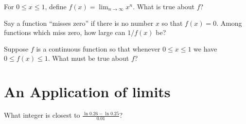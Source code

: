 \documentclass{ximera}
\begin{document}
\begin{problem}

  For $0 \leq x \leq 1$, define
  $f(x) = \lim_{n \to \infty} x^n$.  What is true about $f$?
  \begin{multipleChoice}
  \end{multipleChoice}
\end{problem}

\begin{problem}
  Say a function ``misses zero'' if there is no number $x$ so that
  $f(x) = 0$.  Among functions which miss zero, how large can $1/f(x)$
  be?
  \begin{multipleChoice}
  \end{multipleChoice}
\end{problem}

\begin{problem}
  Suppose $f$ is a continuous function so that whenever $0 \leq x \leq 1$ we have $0 \leq f(x) \leq 1$.  What must be true about $f$?
  \begin{multipleChoice}
  \end{multipleChoice}
\end{problem}

\clearpage

\section{An Application of limits}

\begin{problem}
  What integer is closest to $\frac{\ln 0.26 - \ln 0.25}{0.01}$?
  \begin{multipleChoice}
  \end{multipleChoice}
\end{problem}
\end{document}
